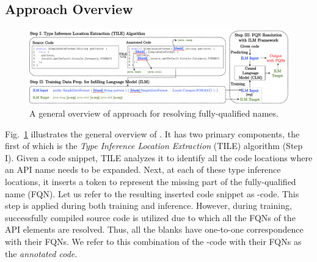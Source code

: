 \subsection{Approach Overview}
\label{sec:overview}

\begin{figure}[t]
 \centering
 \includegraphics[width=.98\textwidth]{overview-ilm-3.pdf}
 \vspace{-12pt}
 \caption{A general overview of \tool approach for resolving fully-qualified names.}
 \label{fig:approach}
\end{figure}


Fig.~\ref{fig:approach} illustrates the general overview of
{\tool}. It has two primary components, the first of which is the {\em
  Type Inference Location Extraction} (TILE) algorithm (Step I). Given
a code snippet, TILE analyzes it to identify all the code locations
where an API name needs to be expanded. Next, at each of these type
inference locations, it inserts a \blank token to represent
the missing part of the fully-qualified name (FQN). Let us refer to
the resulting \blank inserted code snippet as
\blank-code. This step is applied during both training and
inference. However, during training, successfully compiled source code is 
utilized due to which all the FQNs of the API elements are resolved. 
Thus, all the blanks have one-to-one correspondence with their
FQNs. We refer to this combination of the \blank-code with their FQNs
as the {\em annotated code}.

